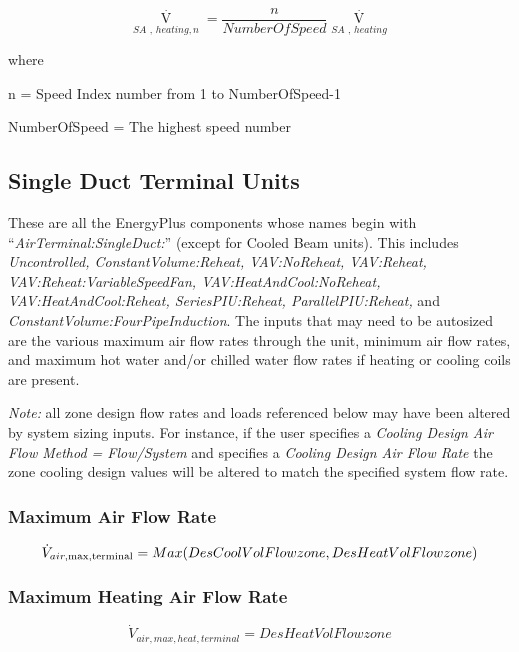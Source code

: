 \begin{equation}
{\mathop V\limits^ \cdot_{SA\,\,,\,heating,n}} = \frac{n}{{NumberOfSpeed}}{\mathop V\limits^ \cdot_{SA\,\,,\,heating}}
\end{equation}

where

n = Speed Index number from 1 to NumberOfSpeed-1

NumberOfSpeed = The highest speed number

\subsection{Single Duct Terminal Units}\label{single-duct-terminal-units}

These are all the EnergyPlus components whose names begin with ``\emph{AirTerminal:SingleDuct:}'' (except for Cooled Beam units). This includes \emph{Uncontrolled, ConstantVolume:Reheat, VAV:NoReheat, VAV:Reheat, VAV:Reheat:VariableSpeedFan, VAV:HeatAndCool:NoReheat, VAV:HeatAndCool:Reheat, SeriesPIU:Reheat, ParallelPIU:Reheat,} and \emph{ConstantVolume:FourPipeInduction}. The inputs that may need to be autosized are the various maximum air flow rates through the unit, minimum air flow rates, and maximum hot water and/or chilled water flow rates if heating or cooling coils are present.

\emph{Note:} all zone design flow rates and loads referenced below may have been altered by system sizing inputs. For instance, if the user specifies a \emph{Cooling Design Air Flow Method = Flow/System} and specifies a \emph{Cooling Design Air Flow Rate} the zone cooling design values will be altered to match the specified system flow rate.

\subsubsection{Maximum Air Flow Rate}\label{maximum-air-flow-rate-3}

\begin{equation}
{\dot V_{air,\max ,{\rm{terminal}}}} = Max(DesCoolVolFlowzone,DesHeatVolFlowzone)
\end{equation}

\subsubsection{Maximum Heating Air Flow Rate}\label{maximum-heating-air-flow-rate}

\begin{equation}
{\dot V_{air,max,heat,terminal}} = DesHeatVolFlowzone
\end{equation}

